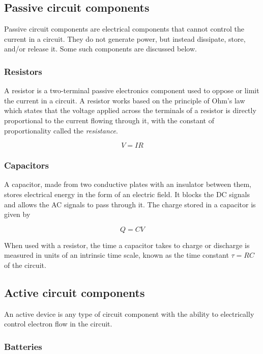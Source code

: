 \subsection*{Passive circuit components}

Passive circuit components are electrical components that cannot control the current in a circuit. They do not generate power, but instead dissipate, store, and/or release it. Some such components are discussed below.

\subsubsection*{Resistors}

A resistor is a two-terminal passive electronics component used to oppose or limit the current in a circuit. A resistor works based on the principle of Ohm’s law which states that the voltage applied across the terminals of a resistor is directly proportional to the current flowing through it, with the constant of proportionality called the \textit{resistance}.

\begin{equation*}
V = I R
\end{equation*}

\subsubsection*{Capacitors}

A capacitor, made from two conductive plates with an insulator between them, stores electrical energy in the form of an electric field. It blocks the DC signals and allows the AC signals to pass through it. The charge stored in a capacitor is given by

\begin{equation*}
Q = CV
\end{equation*}

When used with a resistor, the time a capacitor takes to charge or discharge is measured in units of an intrinsic time scale, known as the time constant $\tau = RC$ of the circuit.

\subsection*{Active circuit components}
An active device is any type of circuit component with the ability to electrically control electron flow in the circuit.

\subsubsection*{Batteries}

